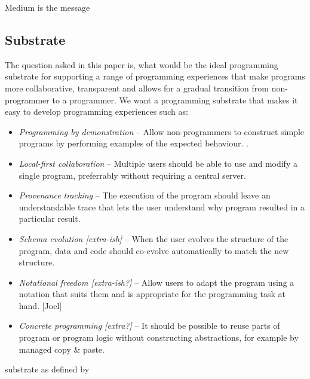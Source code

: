 \documentclass[sigconf,anonymous,screen]{acmart}
\begin{document}
Medium is the message

\subsection{Substrate}

The question asked in this paper is, what would be the ideal programming substrate
for supporting a range of programming experiences that make programs more
collaborative, transparent and allows for a gradual transition from non-programmer
to a programmer. We want a programming substrate that makes it easy to develop
programming experiences such as:

\begin{itemize}
\item \emph{Programming by demonstration} --
  Allow non-programmers to construct simple programs by performing examples of the expected behaviour. \cite{leiva-2021-rapido}.
\item \emph{Local-first collaboration} --
  Multiple users should be able to use and modify a single program, preferrably without requiring a central server. \cite{kleppmann-2019-local}
\item \emph{Provenance tracking} --
  The execution of the program should leave an understandable trace that lets the user understand why program resulted in a particular result.
\item \emph{Schema evolution [extra-ish]} --
  When the user evolves the structure of the program, data and code should co-evolve automatically to match the new structure.
\item \emph{Notational freedom [extra-ish?]} --
  Allow users to adapt the program using a notation that suits them and is appropriate for the programming task at hand. [Joel]
\item \emph{Concrete programming [extra?]} --
  It should be possible to reuse parts of program or program logic without constructing abstractions, for example by managed copy \& paste.\cite{edwards-2006-copypaste,edwards-2022-copypaste}
\end{itemize}

substrate as defined by \cite{jakubovic-2022-ladder}

\cite{leiva-2021-rapido,cypher-1993-pbd}
\cite{chen-2023-miwa}

\cite{kleppmann-2019-local,klokmose-2024-mywebstrates}
\cite{ko-2004-whyline,ko-2009-whyline,krebs-2023-probelog}
\cite{ricciotti-2017-imperative,perera-2012-functional}
\cite{perera-2022-linked}
\end{document}
